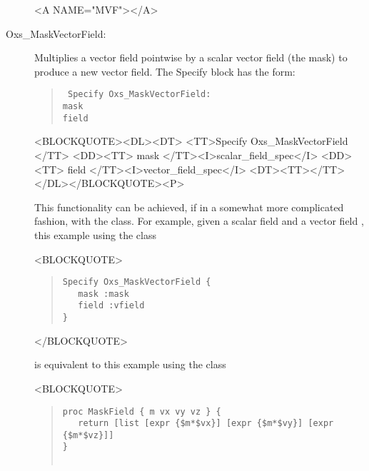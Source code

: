 \begin{description}
\begin{rawhtml}<A NAME="MVF"></A>\end{rawhtml}%
%
\item[Oxs\_MaskVectorField:\label{item:MaskVectorField}]
Multiplies a vector field pointwise by a scalar vector field (the mask)
to produce a new vector field.  The Specify block has the form:
\begin{latexonly}
\begin{quote}\tt
Specify Oxs\_MaskVectorField: \ocb\\
 \bi mask  \\
 \bi field \\
\ccb
\end{quote}
\end{latexonly}
\begin{rawhtml}<BLOCKQUOTE><DL><DT>
<TT>Specify Oxs_MaskVectorField {</TT>
<DD><TT> mask </TT><I>scalar_field_spec</I>
<DD><TT> field </TT><I>vector_field_spec</I>
<DT><TT>}</TT></DL></BLOCKQUOTE><P>
\end{rawhtml}
This functionality can be achieved, if in a somewhat more complicated
fashion, with the
class.  For example, given a scalar field  and a vector field
, this example using the  class
\begin{rawhtml}<BLOCKQUOTE>\end{rawhtml}
\begin{quote}
\begin{verbatim}
Specify Oxs_MaskVectorField {
   mask :mask
   field :vfield
}
\end{verbatim}
\end{quote}
\begin{rawhtml}</BLOCKQUOTE>\end{rawhtml}
is equivalent to this example using the 
class
\begin{rawhtml}<BLOCKQUOTE>\end{rawhtml}
\begin{quote}
\begin{verbatim}
proc MaskField { m vx vy vz } {
   return [list [expr {$m*$vx}] [expr {$m*$vy}] [expr {$m*$vz}]]
}


\end{verbatim}
\end{quote}
\end{description}
